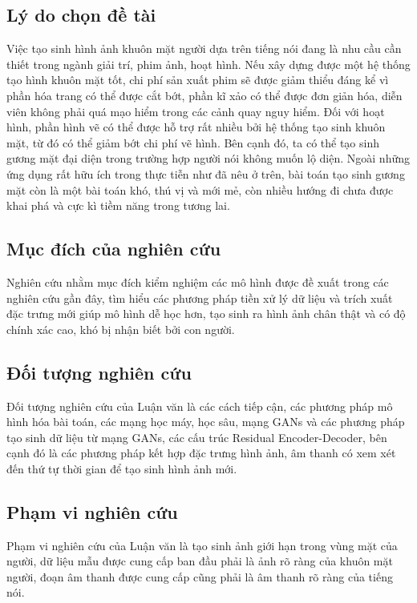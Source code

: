 \subsection{\texorpdfstring{Lý do chọn đề tài}{Why}}
Việc tạo sinh hình ảnh khuôn mặt người dựa trên tiếng nói đang là nhu cầu cần thiết trong ngành giải trí, phim ảnh, hoạt hình. Nếu xây dựng được một hệ thống tạo hình khuôn mặt tốt, chi phí sản xuất phim sẽ được giảm thiểu đáng kể vì phần hóa trang có thể được cắt bớt, phần kĩ xảo có thể được đơn giản hóa, diễn viên không phải quá mạo hiểm trong các cảnh quay nguy hiểm. Đối với hoạt hình, phần hình vẽ có thể được hỗ trợ rất nhiều bởi hệ thống tạo sinh khuôn mặt, từ đó có thể giảm bớt chi phí vẽ hình. Bên cạnh đó, ta có thể tạo sinh gương mặt đại diện trong trường hợp người nói không muốn lộ diện. Ngoài những ứng dụng rất hữu ích trong thực tiễn như đã nêu ở trên, bài toán tạo sinh gương mặt còn là một bài toán khó, thú vị và mới mẻ, còn nhiều hướng đi chưa được khai phá và cực kì tiềm năng trong tương lai.

\subsection{\texorpdfstring{Mục đích của nghiên cứu}{Target}}
Nghiên cứu nhằm mục đích kiểm nghiệm các mô hình được đề xuất trong các nghiên cứu gần đây, tìm hiểu các phương pháp tiền xử lý dữ liệu và trích xuất đặc trưng mới giúp mô hình dễ học hơn, tạo sinh ra hình ảnh chân thật và có độ chính xác cao, khó bị nhận biết bởi con người.

\subsection{\texorpdfstring{Đối tượng nghiên cứu}{Objective}}
Đối tượng nghiên cứu của Luận văn là các cách tiếp cận, các phương pháp mô hình hóa bài toán, các mạng học máy, học sâu, mạng GANs và các phương pháp tạo sinh dữ liệu từ mạng GANs, các cấu trúc Residual Encoder-Decoder, bên cạnh đó là các phương pháp kết hợp đặc trưng hình ảnh, âm thanh có xem xét đến thứ tự thời gian để tạo sinh hình ảnh mới.

\subsection{\texorpdfstring{Phạm vi nghiên cứu}{Research}}
Phạm vi nghiên cứu của Luận văn là tạo sinh ảnh giới hạn trong vùng mặt của người, dữ liệu mẫu được cung cấp ban đầu phải là ảnh rõ ràng của khuôn mặt người, đoạn âm thanh được cung cấp cũng phải là âm thanh rõ ràng của tiếng nói.

